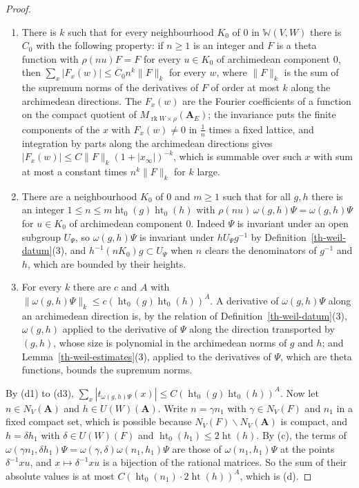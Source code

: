 \begin{proof}
\begin{enumerate}
\item[(d1)] There is $k$ such that for every neighbourhood $K_0$ of $0$ in
  $\mathbb W(V,W)$ there is $C_0$ with the following property: if $n\geq1$ is an
  integer and $F$ is a theta function with $\rho(nu)F=F$ for every $u\in K_0$ of
  archimedean component $0$, then $\sum_x|F_x(w)|\leq C_0n^k\|F\|_k$ for every
  $w$, where $\|F\|_k$ is the sum of the supremum norms of the derivatives of $F$
  of order at most $k$ along the archimedean directions. The $F_x(w)$ are the
  Fourier coefficients of a function on the compact quotient of
  $M_{\operatorname{rk}W\times\rho}(\mathbf A_E)$; the invariance puts the
  finite components of the $x$ with $F_x(w)\neq0$ in $\frac1n$ times a fixed
  lattice, and integration by parts along the archimedean directions gives
  $|F_x(w)|\leq C\|F\|_k(1+|x_\infty|)^{-k}$, which is summable over such $x$
  with sum at most a constant times $n^k\|F\|_k$ for $k$ large.
\item[(d2)] There are a neighbourhood $K_0$ of $0$ and $m\geq1$ such that for all
  $g,h$ there is an integer $1\leq n\leq m\operatorname{ht}_0(g)\operatorname{ht}_0(h)$
  with $\rho(nu)\,\omega(g,h)\Psi=\omega(g,h)\Psi$ for $u\in K_0$ of archimedean
  component $0$. Indeed $\Psi$ is invariant under an open subgroup $U_\Psi$, so
  $\omega(g,h)\Psi$ is invariant under $hU_\Psi g^{-1}$ by
  Definition~\ref{th-weil-datum}(3), and $h^{-1}(nK_0)g\subset U_\Psi$ when $n$
  clears the denominators of $g^{-1}$ and $h$, which are bounded by their
  heights.
\item[(d3)] For every $k$ there are $c$ and $A$ with
  $\|\omega(g,h)\Psi\|_k\leq c(\operatorname{ht}_0(g)\operatorname{ht}_0(h))^A$.
  A derivative of $\omega(g,h)\Psi$ along an archimedean direction is, by the
  relation of Definition~\ref{th-weil-datum}(3), $\omega(g,h)$ applied to the
  derivative of $\Psi$ along the direction transported by $(g,h)$, whose size is
  polynomial in the archimedean norms of $g$ and $h$; and
  Lemma~\ref{th-weil-estimates}(3), applied to the derivatives of $\Psi$, which
  are theta functions, bounds the supremum norms.
\end{enumerate}
By (d1) to (d3), $\sum_x|t_{\omega(g,h)\Psi}(x)|\leq C(\operatorname{ht}_0(g)\operatorname{ht}_0(h))^A$.
Now let $n\in N_V(\mathbf A)$ and $h\in U(W)(\mathbf A)$. Write $n=\gamma n_1$
with $\gamma\in N_V(F)$ and $n_1$ in a fixed compact set, which is possible
because $N_V(F)\backslash N_V(\mathbf A)$ is compact, and $h=\delta h_1$ with
$\delta\in U(W)(F)$ and $\operatorname{ht}_0(h_1)\leq2\operatorname{ht}(h)$. By (c),
the terms of $\omega(\gamma n_1,\delta h_1)\Psi=\omega(\gamma,\delta)\omega(n_1,h_1)\Psi$
are those of $\omega(n_1,h_1)\Psi$ at the points $\delta^{-1}xu$, and
$x\mapsto\delta^{-1}xu$ is a bijection of the rational matrices. So the sum of
their absolute values is at most $C(\operatorname{ht}_0(n_1)\cdot2\operatorname{ht}(h))^A$,
which is (d).


\end{proof}
